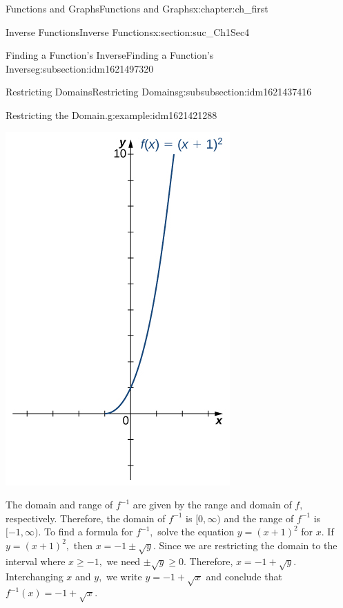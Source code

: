 \documentclass[oneside,10pt,]{book}
\numberwithin{equation}{section}
\begin{document}
\begin{chapterptx}{Functions and Graphs}{}{Functions and Graphs}{}{}{x:chapter:ch_first}
\begin{sectionptx}{Inverse Functions}{}{Inverse Functions}{}{}{x:section:suc_Ch1Sec4}
\begin{subsectionptx}{Finding a Function’s Inverse}{}{Finding a Function’s Inverse}{}{}{g:subsection:idm1621497320}
\begin{subsubsectionptx}{Restricting Domains}{}{Restricting Domains}{}{}{g:subsubsection:idm1621437416}
\begin{example}{Restricting the Domain.}{g:example:idm1621421288}
\begin{enumerate}
\begin{image}{0.25}{0.5}{0.25}
\includegraphics[width=\linewidth]{external/CNX_Calc_Figure_01_04_014.jpg}
\end{image}%
  The domain and range of \(f^{-1} \) are given by the range and domain of \(f,\) respectively. Therefore, the domain of \(f^{-1} \) is \([0,\infty )\) and the range of \(f^{-1} \) is \([-1,\infty ).\) To find a formula for \(f^{-1} ,\) solve the equation \(y=(x+1)^2\) for \(x.\) If \(y=(x+1)^2,\) then \(x=-1\pm \sqrt{y}.\) Since we are restricting the domain to the interval where \(x\geq -1,\) we need \(\pm \sqrt{y}\geq 0.\) Therefore, \(x=-1+\sqrt{y}.\) Interchanging \(x\) and \(y,\) we write \(y=-1+\sqrt{x}\) and conclude that \(f^{-1} (x)=-1+\sqrt{x}.\)%
\end{enumerate}

\end{example}
\end{subsubsectionptx}
\end{subsectionptx}
\end{sectionptx}
\end{chapterptx}
\end{document}
